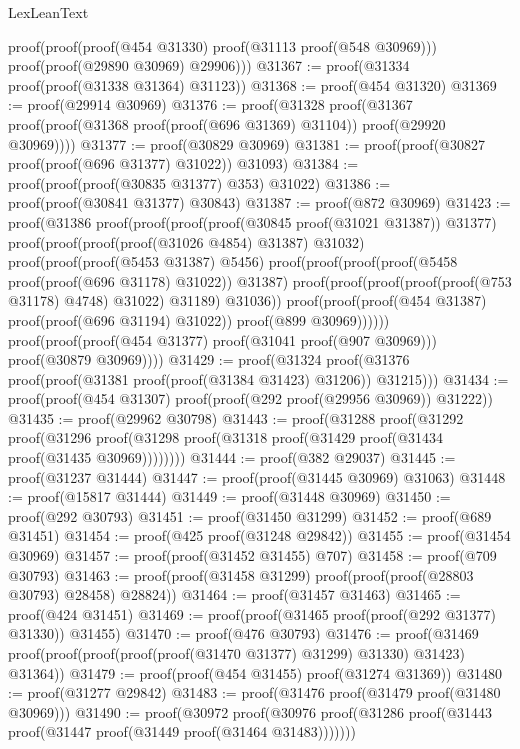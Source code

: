 \begin{lexlean}{LexLeanText}
\begin{coremodule}
      proof(proof(proof(@454 @31330) proof(@31113 proof(@548 @30969)))
          proof(proof(@29890 @30969) @29906)))
@31367 := proof(@31334 proof(proof(@31338 @31364) @31123))
@31368 := proof(@454 @31320)
@31369 := proof(@29914 @30969)
@31376 := proof(@31328
      proof(@31367 proof(proof(@31368 proof(proof(@696 @31369) @31104)) proof(@29920 @30969))))
@31377 := proof(@30829 @30969)
@31381 := proof(proof(@30827 proof(proof(@696 @31377) @31022)) @31093)
@31384 := proof(proof(proof(@30835 @31377) @353) @31022)
@31386 := proof(proof(@30841 @31377) @30843)
@31387 := proof(@872 @30969)
@31423 := proof(@31386
      proof(proof(proof(proof(@30845 proof(@31021 @31387)) @31377)
            proof(proof(proof(proof(@31026 @4854) @31387) @31032)
                proof(proof(proof(@5453 @31387) @5456)
                    proof(proof(proof(proof(@5458 proof(proof(@696 @31178) @31022)) @31387)
                          proof(proof(proof(proof(proof(@753 @31178) @4748) @31022) @31189) @31036))
                        proof(proof(proof(@454 @31387) proof(proof(@696 @31194) @31022))
                            proof(@899 @30969))))))
          proof(proof(proof(@454 @31377) proof(@31041 proof(@907 @30969))) proof(@30879 @30969))))
@31429 := proof(@31324 proof(@31376 proof(proof(@31381 proof(proof(@31384 @31423) @31206)) @31215)))
@31434 := proof(proof(@454 @31307) proof(proof(@292 proof(@29956 @30969)) @31222))
@31435 := proof(@29962 @30798)
@31443 := proof(@31288
      proof(@31292
          proof(@31296
              proof(@31298 proof(@31318 proof(@31429 proof(@31434 proof(@31435 @30969))))))))
@31444 := proof(@382 @29037)
@31445 := proof(@31237 @31444)
@31447 := proof(proof(@31445 @30969) @31063)
@31448 := proof(@15817 @31444)
@31449 := proof(@31448 @30969)
@31450 := proof(@292 @30793)
@31451 := proof(@31450 @31299)
@31452 := proof(@689 @31451)
@31454 := proof(@425 proof(@31248 @29842))
@31455 := proof(@31454 @30969)
@31457 := proof(proof(@31452 @31455) @707)
@31458 := proof(@709 @30793)
@31463 := proof(proof(@31458 @31299) proof(proof(proof(@28803 @30793) @28458) @28824))
@31464 := proof(@31457 @31463)
@31465 := proof(@424 @31451)
@31469 := proof(proof(@31465 proof(proof(@292 @31377) @31330)) @31455)
@31470 := proof(@476 @30793)
@31476 := proof(@31469 proof(proof(proof(proof(proof(@31470 @31377) @31299) @31330) @31423) @31364))
@31479 := proof(proof(@454 @31455) proof(@31274 @31369))
@31480 := proof(@31277 @29842)
@31483 := proof(@31476 proof(@31479 proof(@31480 @30969)))
@31490 := proof(@30972
      proof(@30976 proof(@31286 proof(@31443 proof(@31447 proof(@31449 proof(@31464 @31483)))))))

\end{coremodule}
\end{lexlean}

